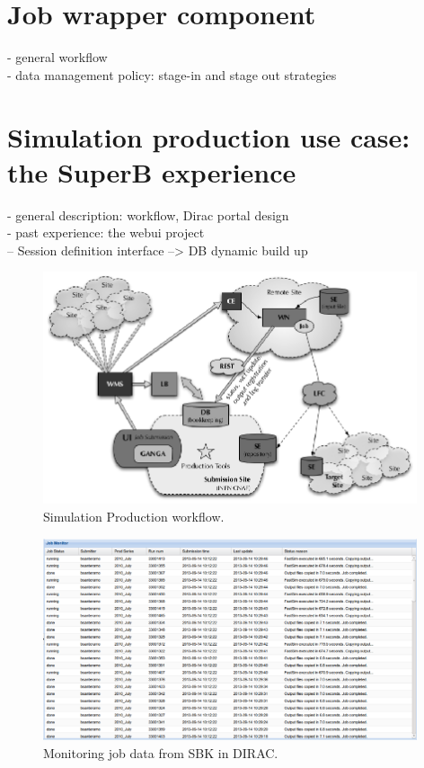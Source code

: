 \documentclass[a4paper]{jpconf}
\begin{document}
\section{Job wrapper component}
- general workflow\\
- data management policy: stage-in and stage out strategies\\
 
\section{Simulation production use case: the SuperB experience}
- general description: workflow, Dirac portal design\\
- past experience: the webui project\\
-- Session definition interface --> DB dynamic build up\\

\begin{figure}[h]
\includegraphics[width=26pc]{img/simulation_production_system_workflow.eps}\hspace{2pc}%
\caption{\label{fig:simulation_production_workflow}Simulation Production workflow.}
\end{figure}
 
\begin{figure}[h]
\includegraphics[width=26pc]{img/SuperBDIRAC_monitoring.eps}\hspace{2pc}%
\caption{\label{fig:superbdirac_monitoring}Monitoring job data from SBK in DIRAC.}
\end{figure}
\end{document}

